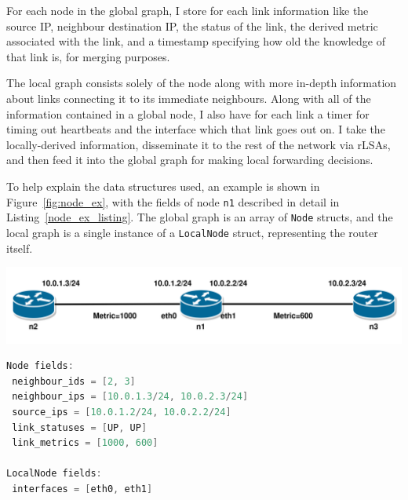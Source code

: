 \documentclass[withindex,glossary,openany]{cam-thesis}
\begin{document}
For each node in the global graph, I store for each link information like the source IP, neighbour destination IP, the status of the link, the derived metric associated with the link, and a timestamp specifying how old the knowledge of that link is, for merging purposes.

The local graph consists solely of the node along with more in-depth information about links connecting it to its immediate neighbours. Along with all of the information contained in a global node, I also have for each link a timer for timing out heartbeats and the interface which that link goes out on. I take the locally-derived information, disseminate it to the rest of the network via rLSAs, and then feed it into the global graph for making local forwarding decisions.

To help explain the data structures used, an example is shown in Figure~\ref{fig:node_ex}, with the fields of node \texttt{n1} described in detail in Listing~\ref{node_ex_listing}. The global graph is an array of \texttt{Node} structs, and the local graph is a single instance of a \texttt{LocalNode} struct, representing the router itself.

\begin{center}
\begin{minipage}{0.9\textwidth} \centering
	\includegraphics[width=1\textwidth]{node}
	\label{fig:node_ex}
\end{minipage}
\end{center}

\begin{minipage}{1\textwidth} \centering
\begin{lstlisting}[language=C, label=node_ex_listing, frame=tb, columns=fullflexible, caption=Partial example of fields of \texttt{Node} and \texttt{LocalNode}]
Node fields:
 neighbour_ids = [2, 3]
 neighbour_ips = [10.0.1.3/24, 10.0.2.3/24]
 source_ips = [10.0.1.2/24, 10.0.2.2/24]
 link_statuses = [UP, UP]
 link_metrics = [1000, 600]

LocalNode fields:
 interfaces = [eth0, eth1]
\end{lstlisting}
\end{minipage}
\end{document}
